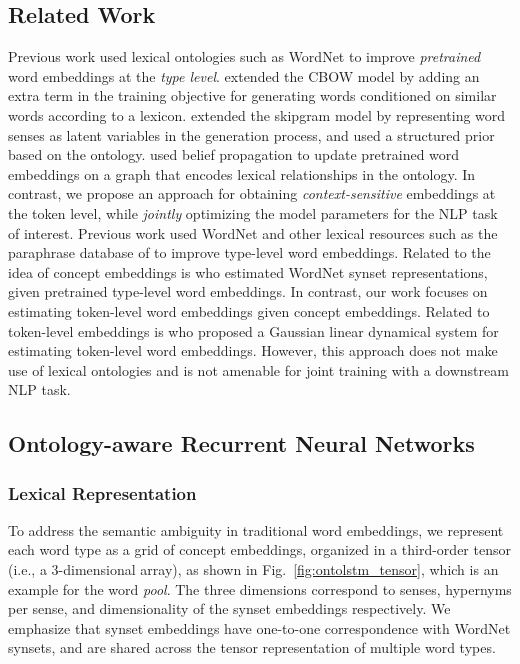 \subsection{Related Work}
Previous work used lexical ontologies such as WordNet to improve \textit{pretrained} word embeddings at the \textit{type level}.
\cite{yu:14} extended the CBOW model \citep{mikolov:13} by adding an extra term in the training objective for generating words conditioned on similar words according to a lexicon.
\cite{jauhar:15} extended the skipgram model \citep{mikolov:13} by representing word senses as latent variables in the generation process, and used a structured prior based on the ontology.
\cite{faruqui:15} used belief propagation to update pretrained word embeddings on a graph that encodes lexical relationships in the ontology.
In contrast, we propose an approach for obtaining \textit{context-sensitive} embeddings at the token level, while \textit{jointly} optimizing the model parameters for the NLP task of interest.
Previous work used WordNet and other lexical resources such as the paraphrase database of \cite{ganitkevitch:13} to improve type-level word embeddings.
Related to the idea of concept embeddings is \cite{rothe:15} who estimated WordNet synset representations, given pretrained type-level word embeddings.
 In contrast, our work focuses on estimating token-level word embeddings given concept embeddings.
 Related to token-level embeddings is \cite{belanger:15} who proposed a Gaussian linear dynamical system for estimating token-level word embeddings. However, this approach does not make use of lexical ontologies and is not amenable for joint training with a downstream NLP task.

\subsection{Ontology-aware Recurrent Neural Networks}
\subsubsection{Lexical Representation}
\label{sec:ontolstm_input_rep}
To address the semantic ambiguity in traditional word embeddings, we represent each word type as a grid of concept embeddings, organized in a third-order tensor (i.e., a 3-dimensional array), as shown in Fig.~\ref{fig:ontolstm_tensor}, 
which is an example for the word \textit{pool}. The three dimensions correspond to senses, hypernyms per sense, and dimensionality of the synset embeddings respectively. We emphasize that synset embeddings have one-to-one correspondence with WordNet synsets,
and are shared across the tensor representation of multiple word types.

